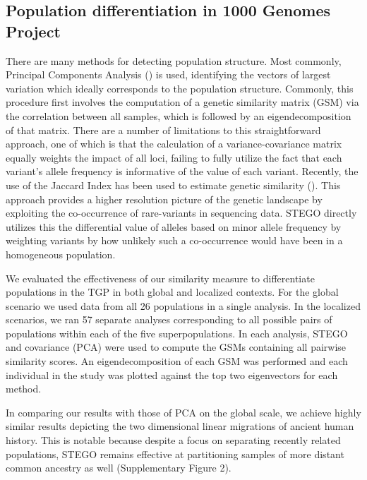 \subsection{Population differentiation in 1000 Genomes Project}

There are many methods for detecting population structure. Most commonly,
Principal Components Analysis (\citealp{price2006principal,price2010new})
is used, identifying the vectors of largest variation which
ideally corresponds to the population structure. Commonly, this procedure first
involves the computation of a genetic similarity matrix (GSM) via
the correlation between all samples, which is followed by
an eigendecomposition of that matrix. There are a number of limitations
to this straightforward approach, one of which is that the calculation
of a variance-covariance matrix equally weights the impact of all
loci, failing to fully utilize the fact that each variant's allele frequency
is informative of the value of each variant. Recently, the use of
the Jaccard Index has been used to estimate genetic similarity (\citealp{prokopenko2016utilizing}).
This approach provides a higher resolution picture of the genetic
landscape by exploiting the co-occurrence of rare-variants in sequencing
data. STEGO directly utilizes this the differential value of alleles
based on minor allele frequency by weighting variants by how unlikely
such a co-occurrence would have been in a homogeneous population. 

We evaluated the effectiveness of our similarity measure to differentiate
populations in the TGP in both global and localized contexts. For
the global scenario we used data from all 26 populations in a single
analysis. In the localized scenarios, we ran 57 separate analyses
corresponding to all possible pairs of populations within each of
the five superpopulations. In each analysis, STEGO and covariance (PCA) were used to compute
the GSMs containing all pairwise similarity scores. An eigendecomposition
of each GSM was performed and each individual in the study was plotted
against the top two eigenvectors for each method. 

In comparing our results with those of PCA on the global scale, we achieve highly similar
results depicting the two dimensional linear migrations
of ancient human history. This is notable because despite a focus on separating recently
related populations, STEGO remains effective at partitioning samples of
more distant common ancestry as well (Supplementary Figure 2). 

